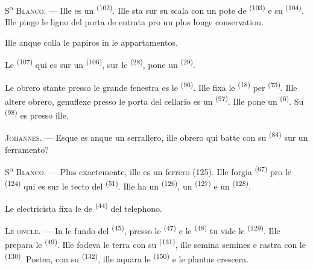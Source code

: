 \VUsaut{3.0mm}
\VUsaut{3.0mm}

S\textsuperscript{o} \textsc{Blanco}. --- Ille es un 
\textsuperscript{(102)}. Ille sta sur su scala con un pote de 
\textsuperscript{(103)} e su  \textsuperscript{(104)}. Ille pinge
le ligno del porta de entrata pro un plus longe conservation.

Ille anque colla le papiros in le appartamentos.

Le  \textsuperscript{(107)} qui es sur un 
\textsuperscript{(106)}, sur le  \textsuperscript{(28)}, pone un
 \textsuperscript{(29)}.

Le obrero stante presso le grande fenestra es le 
\textsuperscript{(96)}. Ille fixa le  \textsuperscript{(18)} per
 \textsuperscript{(73)}. Ille altere obrero, genuflexe presso le
porta del cellario es un  \textsuperscript{(97)}. Ille pone
un  \textsuperscript{(6)}. Su 
\textsuperscript{(98)} es presso ille.

\textsc{Johannes}. --- Esque es anque un serrallero, ille obrero qui batte con
su  \textsuperscript{(84)} sur un ferramento?

S\textsuperscript{o} \textsc{Blanco}. --- Plus exactemente, ille es un ferrero
(125). Ille forgia  \textsuperscript{(67)} pro le
 \textsuperscript{(124)} qui es sur le tecto del
 \textsuperscript{(51)}. Ille ha un 
\textsuperscript{(126)}, un  \textsuperscript{(127)} e un
 \textsuperscript{(128)}.

Le electricista fixa le  de  \textsuperscript{(44)}
del telephono.

\VUsaut{3.0mm}

\textsc{Le oncle}. --- In le fundo del  \textsuperscript{(45)},
presso le  \textsuperscript{(47)} e le 
\textsuperscript{(48)} tu vide le  \textsuperscript{(129)}.
Ille prepara le  \textsuperscript{(49)}. Ille fodeva le
terra con su  \textsuperscript{(131)}, ille semina semines e rastra
con le  \textsuperscript{(130)}. Postea, con su
 \textsuperscript{(132)}, ille aquara le 
\textsuperscript{(150)} e le plantas crescera.


